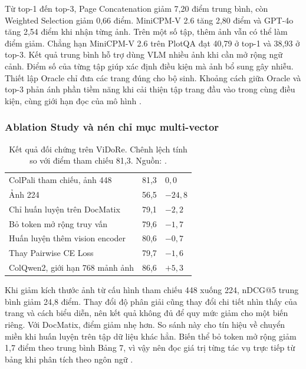 Từ top-1 đến top-3, Page Concatenation giảm 7,20 điểm trung bình,
còn Weighted Selection giảm 0,66 điểm. MiniCPM-V 2.6 tăng
2,80 điểm và GPT-4o tăng 2,54 điểm khi nhận từng ảnh. Trên
một số tập, thêm ảnh vẫn có thể làm điểm giảm. Chẳng hạn
MiniCPM-V 2.6 trên PlotQA đạt 40,79 ở top-1 và 38,93 ở
top-3. Kết quả trung bình hỗ trợ dùng VLM nhiều ảnh khi
cần mở rộng ngữ cảnh. Điểm số của từng tập giúp xác định
điều kiện mà ảnh bổ sung gây nhiễu. Thiết lập Oracle chỉ
đưa các trang đúng cho bộ sinh. Khoảng cách giữa Oracle
và top-3 phản ánh phần tiềm năng khi cải thiện tập trang
đầu vào trong cùng điều kiện, cùng giới hạn đọc của
mô hình \cite{yu2025visrag}.

\subsubsection{Ablation Study và nén chỉ mục multi-vector}
\label{subsec:tv2_ablation}

\begin{table}[htbp]
\centering
\small
\caption[Biến thể mô hình ColPali trên ViDoRe]{Kết quả đối chứng trên ViDoRe. Chênh lệch tính so với điểm tham chiếu 81,3. Nguồn: \cite{faysse2025colpali}.}
\label{tab:tv2_ablation}
\renewcommand{\arraystretch}{1.18}
\begin{tabularx}{\textwidth}{@{}L M{2.4cm} M{2.8cm}@{}}
\toprule
{}
 &  &  \\
\midrule
ColPali tham chiếu, ảnh 448 & 81,3 & $0{,}0$ \\
Ảnh 224 & 56,5 & $-24{,}8$ \\
Chỉ huấn luyện trên DocMatix & 79,1 & $-2{,}2$ \\
Bỏ token mở rộng truy vấn & 79,6 & $-1{,}7$ \\
Huấn luyện thêm vision encoder & 80,6 & $-0{,}7$ \\
Thay Pairwise CE Loss & 79,7 & $-1{,}6$ \\
ColQwen2, giới hạn 768 mảnh ảnh & 86,6 & $+5{,}3$ \\
\bottomrule
\end{tabularx}
\end{table}

Khi giảm kích thước ảnh từ cấu hình tham chiếu 448
xuống 224, nDCG@5 trung bình giảm 24,8 điểm. Thay đổi độ
phân giải cũng thay đổi chi tiết nhìn thấy của trang và
cách biểu diễn, nên kết quả không đủ để quy mức giảm
cho một biến riêng. Với DocMatix, điểm giảm nhẹ hơn.
So sánh này cho tín hiệu về chuyển miền khi huấn luyện
trên tập dữ liệu khác hẳn. Biến thể bỏ token mở rộng
giảm 1,7 điểm theo trung bình Bảng 7, vì vậy nên đọc
giá trị từng tác vụ trực tiếp từ bảng khi phân tích
theo ngôn ngữ \cite{faysse2025colpali}.

